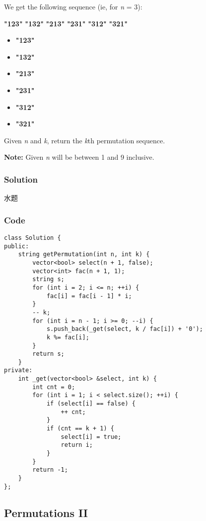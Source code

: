 \documentclass[courier]{article}
\begin{document}
\begin{CJK*}{UTF8}{gkai}
We get the following sequence (ie, for \emph{n} = 3):

\textbf{"123"}
\textbf{"132"}
\textbf{"213"}
\textbf{"231"}
\textbf{"312"}
\textbf{"321"}

\begin{itemize}
\item \textbf{"123"}
\item \textbf{"132"}
\item \textbf{"213"}
\item \textbf{"231"}
\item \textbf{"312"}
\item \textbf{"321"}
\end{itemize}

Given \emph{n} and \emph{k}, return the \emph{k}th permutation sequence.

\textbf{Note:} Given \emph{n} will be between 1 and 9 inclusive.



\subsubsection*{Solution}
水题

\subsubsection*{Code}
\begin{lstlisting}
class Solution {
public:
    string getPermutation(int n, int k) {
        vector<bool> select(n + 1, false);
        vector<int> fac(n + 1, 1);
        string s;
        for (int i = 2; i <= n; ++i) {
            fac[i] = fac[i - 1] * i;
        }
        -- k;
        for (int i = n - 1; i >= 0; --i) {
            s.push_back(_get(select, k / fac[i]) + '0');
            k %= fac[i];
        }
        return s;
    }
private:
    int _get(vector<bool> &select, int k) {
        int cnt = 0;
        for (int i = 1; i < select.size(); ++i) {
            if (select[i] == false) {
                ++ cnt;
            }
            if (cnt == k + 1) {
                select[i] = true;
                return i;
            }
        }
        return -1;
    }
};

\end{lstlisting}


\subsection{ Permutations II }


\end{CJK*}
\end{document}
